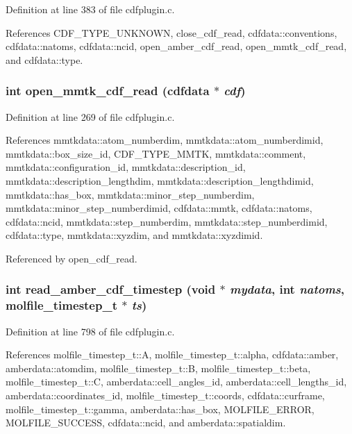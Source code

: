 Definition at line 383 of file cdfplugin.c.

References CDF\_\-TYPE\_\-UNKNOWN, close\_\-cdf\_\-read, cdfdata::conventions, cdfdata::natoms, cdfdata::ncid, open\_\-amber\_\-cdf\_\-read, open\_\-mmtk\_\-cdf\_\-read, and cdfdata::type.
\subsubsection{\setlength{\rightskip}{0pt plus 5cm}int open\_\-mmtk\_\-cdf\_\-read ({\bf cdfdata} $\ast$ {\em cdf})\hspace{0.3cm}{\tt  [static]}}\label{cdfplugin_8c_a6}




Definition at line 269 of file cdfplugin.c.

References mmtkdata::atom\_\-numberdim, mmtkdata::atom\_\-numberdimid, mmtkdata::box\_\-size\_\-id, CDF\_\-TYPE\_\-MMTK, mmtkdata::comment, mmtkdata::configuration\_\-id, mmtkdata::description\_\-id, mmtkdata::description\_\-lengthdim, mmtkdata::description\_\-lengthdimid, mmtkdata::has\_\-box, mmtkdata::minor\_\-step\_\-numberdim, mmtkdata::minor\_\-step\_\-numberdimid, cdfdata::mmtk, cdfdata::natoms, cdfdata::ncid, mmtkdata::step\_\-numberdim, mmtkdata::step\_\-numberdimid, cdfdata::type, mmtkdata::xyzdim, and mmtkdata::xyzdimid.

Referenced by open\_\-cdf\_\-read.
\subsubsection{\setlength{\rightskip}{0pt plus 5cm}int read\_\-amber\_\-cdf\_\-timestep (void $\ast$ {\em mydata}, int {\em natoms}, {\bf molfile\_\-timestep\_\-t} $\ast$ {\em ts})\hspace{0.3cm}{\tt  [static]}}\label{cdfplugin_8c_a14}




Definition at line 798 of file cdfplugin.c.

References molfile\_\-timestep\_\-t::A, molfile\_\-timestep\_\-t::alpha, cdfdata::amber, amberdata::atomdim, molfile\_\-timestep\_\-t::B, molfile\_\-timestep\_\-t::beta, molfile\_\-timestep\_\-t::C, amberdata::cell\_\-angles\_\-id, amberdata::cell\_\-lengths\_\-id, amberdata::coordinates\_\-id, molfile\_\-timestep\_\-t::coords, cdfdata::curframe, molfile\_\-timestep\_\-t::gamma, amberdata::has\_\-box, MOLFILE\_\-ERROR, MOLFILE\_\-SUCCESS, cdfdata::ncid, and amberdata::spatialdim.

